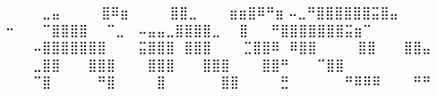 ⠀⠀⠀⠀⣀⣤
⠀⠀⠀⠀⣿⠿⣶
⠀⠀⠀⠀⣿⣿⣀
⠀⠀⠀⣶⣶⣿⠿⠛⣶
⠤⣀⠛⣿⣿⣿⣿⣿⣿⣭⣿⣤
⠒⠀⠀⠀⠉⣿⣿⣿⣿⠀⠀⠉⣀
⠀⠤⣤⣤⣀⣿⣿⣿⣿⣀⠀⠀⣿
⠀⠀⠛⣿⣿⣿⣿⣿⣿⣿⣭⣶⠉
⠀⠀⠀⠤⣿⣿⣿⣿⣿⣿⣿
⠀⠀⠀⣭⣿⣿⣿⠀⣿⣿⣿
⠀⠀⠀⣉⣿⣿⠿⠀⠿⣿⣿
⠀⠀⠀⠀⣿⣿⠀⠀⠀⣿⣿⣤
⠀⠀⠀⣀⣿⣿⠀⠀⠀⣿⣿⣿
⠀⠀⠀⣿⣿⣿⠀⠀⠀⣿⣿⣿
⠀⠀⠀⣿⣿⠛⠀⠀⠀⠉⣿⣿
⠀⠀⠀⠉⣿⠀⠀⠀⠀⠀⠛⣿
⠀⠀⠀⠀⣿⠀⠀⠀⠀⠀⠀⣿⣿
⠀⠀⠀⠀⣛⠀⠀⠀⠀⠀⠀⠛⠿⠿⠿
⠀⠀⠀⠛⠛